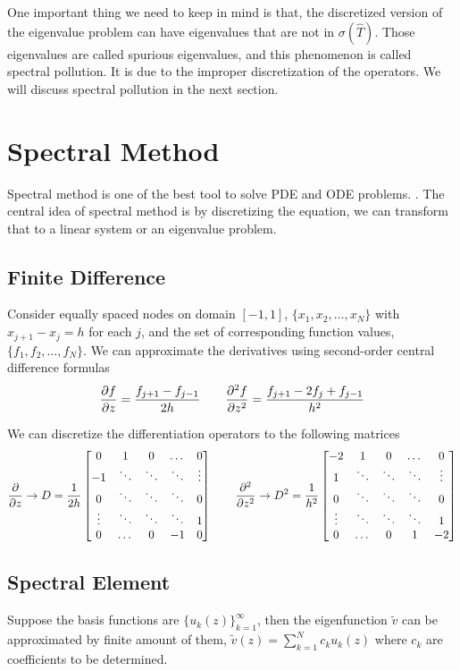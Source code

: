 One important thing we need to keep in mind is that, the discretized version of the eigenvalue problem can have eigenvalues that are not in $\sigma(\hat{T})$. Those eigenvalues are called spurious eigenvalues, and this phenomenon is called spectral pollution. It is due to the improper discretization of the operators. We will discuss spectral pollution in the next section.

\section{Spectral Method}
Spectral method is one of the best tool to solve PDE and ODE problems. \cite{trefethen_spectral_2000}. The central idea of spectral method is by discretizing the equation, we can transform that to a linear system or an eigenvalue problem.
\subsection{Finite Difference}
Consider equally spaced nodes on domain $[-1,1]$, $\{x_1, x_2, \dots, x_N\}$ with $x_{j+1}-x_{j} = h$ for each $j$, and the set of corresponding function values, $\{ f_1, f_2, \dots, f_N \}$. We can approximate the derivatives using second-order central difference formulas
\[ 
\pdv{f}{z} = \frac{f_{j+1} - f_{j-1}}{2h}
\qquad
\pdv[2]{f}{z} = \frac{f_{j+1} -2f_{j} +f_{j-1}}{h^2}
\]

We can discretize the differentiation operators to the following matrices
\[ 
\pdv{z} \rightarrow D = \frac{1}{2h}\begin{bmatrix}
	0 & 1 & 0 & \dots & 0 \\
	-1 & \ddots & \ddots & \ddots & \vdots \\ 
	0 & \ddots & \ddots & \ddots & 0 \\
	\vdots & \ddots & \ddots & \ddots & 1 \\
	0 & \dots & 0 & -1 & 0 
\end{bmatrix} 
\qquad
\pdv[2]{z} \rightarrow  D^2 = \frac{1}{h^2}\begin{bmatrix}
	-2 & 1 & 0 & \dots & 0 \\
	1 & \ddots & \ddots & \ddots & \vdots \\ 
	0 & \ddots & \ddots & \ddots & 0 \\
	\vdots & \ddots & \ddots & \ddots & 1 \\
	0 & \dots & 0 & 1 & -2 
\end{bmatrix} 
\]

\subsection{Spectral Element}
Suppose the basis functions are $\{u_k(z)\}_{k=1}^\infty$, then the eigenfunction $\tilde{v}$ can be approximated by finite amount of them, $\tilde{v}(z) = \sum_{k=1}^N c_ku_k(z)$ where $c_k$ are coefficients to be determined.

